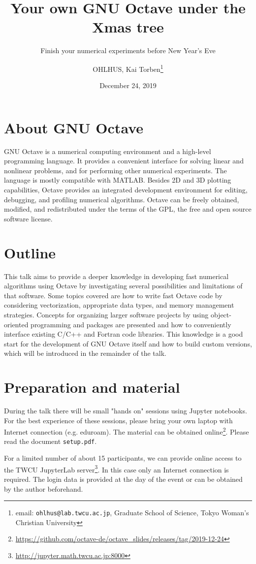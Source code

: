 \documentclass{scrartcl}
\title{Your own GNU Octave under the Xmas tree}
\subtitle{Finish your numerical experiments before New Year's Eve}
\author{OHLHUS, Kai Torben\footnote{email: \texttt{ohlhus@lab.twcu.ac.jp},
Graduate School of Science,
Tokyo Woman's Christian University}}
\date{December 24, 2019}
\begin{document}
\maketitle

\section*{About GNU Octave}

GNU Octave is a numerical computing environment
and a high-level programming language.
It provides a convenient interface for solving linear and nonlinear problems,
and for performing other numerical experiments.
The language is mostly compatible with MATLAB.
Besides 2D and 3D plotting capabilities,
Octave provides an integrated development environment for editing,
debugging, and profiling numerical algorithms.
Octave can be freely obtained, modified, and redistributed
under the terms of the GPL, the free and open source software license.

\section*{Outline}

This talk aims to provide a deeper knowledge in developing
fast numerical algorithms using Octave by investigating several possibilities
and limitations of that software.
Some topics covered are how to write fast Octave code by considering
vectorization, appropriate data types, and memory management strategies.
Concepts for organizing larger software projects
by using object-oriented programming and packages are presented
and how to conveniently interface existing C/C++ and Fortran code libraries.
This knowledge is a good start for the development of GNU Octave itself
and how to build custom versions,
which will be introduced in the remainder of the talk.

\section*{Preparation and material}

During the talk there will be small "hands on" sessions using Jupyter notebooks.
For the best experience of these sessions,
please bring your own laptop with Internet connection (e.g. eduroam).
The material can be obtained online\footnote{\url{https://github.com/octave-de/octave_slides/releases/tag/2019-12-24}}.
Please read the document \texttt{setup.pdf}.

For a limited number of about 15 participants,
we can provide online access to the TWCU JupyterLab server\footnote{\url{http://jupyter.math.twcu.ac.jp:8000}}.
In this case only an Internet connection is required.
The login data is provided at the day of the event
or can be obtained by the author beforehand.
\end{document}
